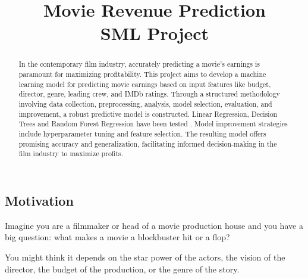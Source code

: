 \documentclass[conference]{IEEEtran}
\begin{document}
\title{Movie Revenue Prediction\\ SML Project}

\author{
     \vspace*{3.0pt}
    \and
     \vspace*{3.0pt}
}


\maketitle

\begin{abstract}
    In the contemporary film industry, accurately predicting a movie's earnings is paramount for maximizing profitability. This project aims to develop a machine learning model for predicting movie earnings based on input features like budget, director, genre, leading crew, and IMDb ratings. Through a structured methodology involving data collection, preprocessing, analysis, model selection, evaluation, and improvement, a robust predictive model is constructed. Linear Regression, Decision Trees and Random Forest Regression have been tested . Model improvement strategies include hyperparameter tuning and feature selection. The resulting model offers promising accuracy and generalization, facilitating informed decision-making in the film industry to maximize profits.
\end{abstract}

\IEEEpeerreviewmaketitle

    \subsection{Motivation}
        Imagine you are a filmmaker or head of a movie production house and you have a big question: what makes a movie a blockbuster hit or a flop?
        
        You might think it depends on the star power of the actors, the vision of the director, the budget of the production, or the genre of the story.
        
\end{document}
